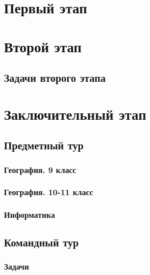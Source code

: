 \documentclass[a4paper,12pt,oneside]{book}
\begin{document}

\setcounter{tocdepth}{1}

\tableofcontents

\part{Первый этап}




\part{Второй этап}
\clearpage
\chapter{Задачи второго этапа}



\part{Заключительный этап}

\clearpage
\chapter{Предметный тур}

\section{География. 9 класс}

\section{География. 10-11 класс}

\section{Информатика}


\chapter{Командный тур}
\section{Задачи}
\end{document}
